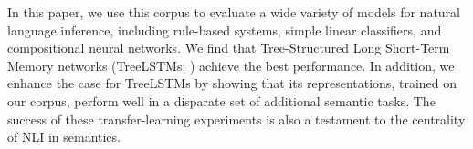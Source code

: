 In this paper, we use this corpus to evaluate a wide variety of models
for natural language inference, including rule-based systems, simple
linear classifiers, and compositional neural networks. We find that
Tree-Structured Long Short-Term Memory networks (TreeLSTMs;
\citealt{tai2015improved,le2015compositional}) achieve the best
performance. In addition, we enhance the case for TreeLSTMs by showing
that its representations, trained on our corpus, perform well in a
disparate set of additional semantic tasks.  The success of these
transfer-learning experiments is also a testament to the centrality
of NLI in semantics.








